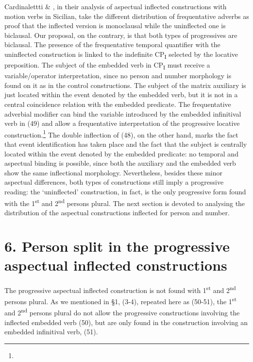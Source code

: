 \documentclass[output=paper]{langsci/langscibook}
\begin{document}
Cardinalettti \& \citet{Giusti2003}, in their analysis of aspectual inflected constructions with motion verbs in Sicilian, take the different distribution of frequentative adverbs as proof that the inflected version is monoclausal while the uninflected one is biclausal. Our proposal, on the contrary, is that both types of progressives are biclausal. The presence of the frequentative temporal quantifier with the uninflected construction is linked to the indefinite CP\textsubscript{I} selected by the locative preposition. The subject of the embedded verb in CP\textsubscript{I} must receive a variable/operator interpretation, since no person and number morphology is found on it as in the control constructions. The subject of the matrix auxiliary is just located within the event denoted by the embedded verb, but it is not in a central coincidence relation with the embedded predicate. The frequentative adverbial modifier can bind the variable introduced by the embedded infinitival verb in (49) and allow a frequentative interpretation of the progressive locative construction.\footnote{} The double inflection of (48), on the other hand, marks the fact that event identification has taken place and the fact that the subject is centrally located within the event denoted by the embedded predicate: no temporal and aspectual binding is possible, since both the auxiliary and the embedded verb show the same inflectional morphology. Nevertheless, besides these minor aspectual differences, both types of constructions still imply a progressive reading: the ‘uninflected’ construction, in fact, is the only progressive form found with the 1\textsuperscript{st} and 2\textsuperscript{nd} persons plural. The next section is devoted to analysing the distribution of the aspectual constructions inflected for person and number.

\section{ 6. Person split in the progressive aspectual inflected constructions}

The progressive aspectual inflected construction is not found with 1\textsuperscript{st} and 2\textsuperscript{nd} persons plural. As we mentioned in §1, (3-4), repeated here as (50-51), the 1\textsuperscript{st} and 2\textsuperscript{nd} persons plural do not allow the progressive constructions involving the inflected embedded verb (50), but are only found in the construction involving an embedded infinitival verb, (51). 
\end{document}

